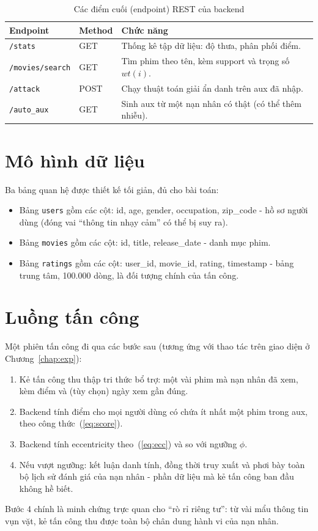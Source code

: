 \begin{table}[!htb]
\centering
\caption{Các điểm cuối (endpoint) REST của backend}
\label{tab:api}
\renewcommand{\arraystretch}{1.3}
\begin{tabularx}{\linewidth}{p{3.6cm} p{1.4cm} X}
\toprule
\textbf{Endpoint} & \textbf{Method} & \textbf{Chức năng} \\
\midrule
\texttt{/stats} & GET & Thống kê tập dữ liệu: độ thưa, phân phối điểm. \\
\texttt{/movies/\allowbreak search} & GET & Tìm phim theo tên, kèm support và trọng số $wt(i)$. \\
\texttt{/attack} & POST & Chạy thuật toán giải ẩn danh trên aux đã nhập. \\
\texttt{/auto\_aux} & GET & Sinh aux từ một nạn nhân có thật (có thể thêm nhiễu). \\
\bottomrule
\end{tabularx}
\end{table}

\section{Mô hình dữ liệu}

Ba bảng quan hệ được thiết kế tối giản, đủ cho bài toán:
\renewcommand{\labelitemi}{$-$}
\begin{itemize}
	\item Bảng \texttt{users} gồm các cột: id, age, gender, occupation, zip\_code - hồ sơ người dùng (đóng vai ``thông tin nhạy cảm'' có thể bị suy ra).
	\item Bảng \texttt{movies} gồm các cột: id, title, release\_date - danh mục phim.
	\item Bảng \texttt{ratings} gồm các cột: user\_id, movie\_id, rating, timestamp - bảng trung tâm, 100.000 dòng, là đối tượng chính của tấn công.
\end{itemize}

\section{Luồng tấn công}

Một phiên tấn công đi qua các bước sau (tương ứng với thao tác trên giao diện ở Chương~\ref{chap:exp}):
\begin{enumerate}[1.]
	\item Kẻ tấn công thu thập tri thức bổ trợ: một vài phim mà nạn nhân đã xem, kèm điểm và (tùy chọn) ngày xem gần đúng.
	\item Backend tính điểm cho mọi người dùng có chứa ít nhất một phim trong aux, theo công thức~(\ref{eq:score}).
	\item Backend tính eccentricity theo~(\ref{eq:ecc}) và so với ngưỡng $\phi$.
	\item Nếu vượt ngưỡng: kết luận danh tính, đồng thời truy xuất và phơi bày toàn bộ lịch sử đánh giá của nạn nhân - phần dữ liệu mà kẻ tấn công ban đầu không hề biết.
\end{enumerate}

Bước 4 chính là minh chứng trực quan cho ``rò rỉ riêng tư'': từ vài mẩu thông tin vụn vặt, kẻ tấn công thu được toàn bộ chân dung hành vi của nạn nhân.
